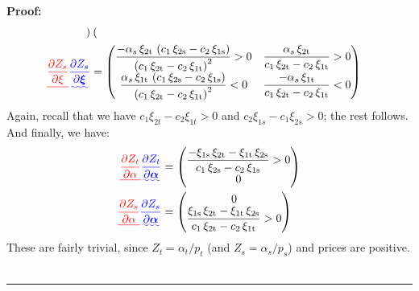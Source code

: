 \documentclass[11pt,a4paper,leqno]{extarticle}
\newenvironment{proof}[1][Proof]{\noindent\textbf{#1:} }{\ \rule{0.5em}{0.5em}}
\providecommand{\DIFadd}[1]{{\protect\color{blue}\uwave{#1}}} %
\providecommand{\DIFdel}[1]{{\protect\color{red}\sout{#1}}}                      %
\providecommand{\DIFaddbegin}{} %
\providecommand{\DIFaddend}{} %
\providecommand{\DIFdelbegin}{} %
\providecommand{\DIFdelend}{} %
\begin{document}
\begin{proof}
\begin{align*}
\begin{pmatrix}
	\end{pmatrix}\\
	\DIFdelbegin \DIFdel{\frac{\partial Z_s}{\partial \xi} }\DIFdelend \DIFaddbegin \DIFadd{\frac{\partial Z_s}{\partial \boldsymbol{\xi}} }\DIFaddend &= 
	\begin{pmatrix}
	\dfrac{-\alpha _{s}\,\xi _{\mathrm{2t}}\,\left(c_{1}\,\xi _{\mathrm{2s}}-c_{2}\,\xi _{\mathrm{1s}}\right)}{{\left(c_{1}\,\xi _{\mathrm{2t}}-c_{2}\,\xi _{\mathrm{1t}}\right)}^2}> 0& \dfrac{\alpha _{s}\,\xi _{\mathrm{2t}}}{c_{1}\,\xi _{\mathrm{2t}}-c_{2}\,\xi _{\mathrm{1t}}} > 0\\
	\dfrac{\alpha _{s}\,\xi _{\mathrm{1t}}\,\left(c_{1}\,\xi _{\mathrm{2s}}-c_{2}\,\xi _{\mathrm{1s}}\right)}{{\left(c_{1}\,\xi _{\mathrm{2t}}-c_{2}\,\xi _{\mathrm{1t}}\right)}^2} < 0& \dfrac{-\alpha _{s}\,\xi _{\mathrm{1t}}}{c_{1}\,\xi _{\mathrm{2t}}-c_{2}\,\xi _{\mathrm{1t}}} <0\\
	\end{pmatrix}
	\end{align*}
	Again, recall that we have $c_1 \xi_{2t} - c_2 \xi_{1t} > 0$ and $c_2 \xi_{1s} - c_1 \xi_{2s} > 0$; the rest follows. And finally, we have:
	\begin{align*}
	\DIFdelbegin \DIFdel{\frac{\partial Z_t}{\partial \alpha} }\DIFdelend \DIFaddbegin \DIFadd{\frac{\partial Z_t}{\partial \boldsymbol{\alpha}} }\DIFaddend &= 
	\begin{pmatrix}
	\dfrac{-\xi _{\mathrm{1s}}\,\xi _{\mathrm{2t}}-\xi _{\mathrm{1t}}\,\xi _{\mathrm{2s}}}{c_{1}\,\xi _{\mathrm{2s}}-c_{2}\,\xi _{\mathrm{1s}}} > 0  \\
	0
	\end{pmatrix} \\
	\DIFdelbegin \DIFdel{\frac{\partial Z_s}{\partial \alpha} }\DIFdelend \DIFaddbegin \DIFadd{\frac{\partial Z_s}{\partial \boldsymbol{\alpha}} }\DIFaddend &= 
	\begin{pmatrix}
	0 \\
	\dfrac{\xi _{\mathrm{1s}}\,\xi _{\mathrm{2t}}-\xi _{\mathrm{1t}}\,\xi _{\mathrm{2s}}}{c_{1}\,\xi _{\mathrm{2t}}-c_{2}\,\xi _{\mathrm{1t}}} > 0
	\end{pmatrix}
	\end{align*}
	These are fairly trivial, since $Z_t = \alpha_t / p_t$ (and $Z_s = \alpha_s/ p_s$) and prices are positive. \\
	\hfill
\end{proof}
\end{document}
